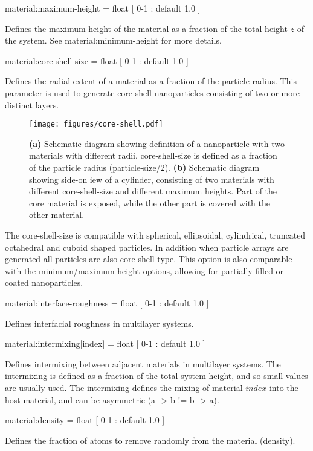 {\zicf material:maximum-height = float [ 0-1 : default 1.0 ]} Defines the maximum height of the material as a fraction of the total height $z$ of the system. See material:minimum-height for more details.

{\zicf material:core-shell-size = float [ 0-1 : default 1.0 ]} Defines the radial extent of a material as a fraction of the particle radius. This parameter is used to generate core-shell nanoparticles consisting of two or more distinct layers.

\begin{figure*}[!htb]
\center
\texttt{[image: figures/core-shell.pdf]}
\caption{\textbf{(a)} Schematic diagram showing definition of a nanoparticle with two materials with different radii. core-shell-size is defined as a fraction of the particle radius (particle-size/2). \textbf{(b)} Schematic diagram showing side-on iew of a cylinder, consisting of two materials with different core-shell-size and different maximum heights. Part of the core material is exposed, while the other part is covered with the other material.}
\label{fig:core-shell}
\end{figure*}

The core-shell-size is compatible with spherical, ellipsoidal, cylindrical, truncated octahedral and cuboid shaped particles. In addition when particle arrays are generated all particles are also core-shell type. This option is also comparable with the minimum/maximum-height options, allowing for partially filled or coated nanoparticles.

{\zicf material:interface-roughness = float [ 0-1 : default 1.0 ]} Defines interfacial roughness in multilayer systems.

{\zicf material:intermixing[index] = float [ 0-1 : default 1.0 ]} Defines intermixing between adjacent materials in multilayer systems. The intermixing is defined as a fraction of the total system height, and so small values are usually used. The intermixing defines the mixing of material $index$ into the host material, and can be asymmetric (a -> b != b -> a).

{\zicf material:density = float [ 0-1 : default 1.0 ]} Defines the fraction of atoms to remove randomly from the material (density).

